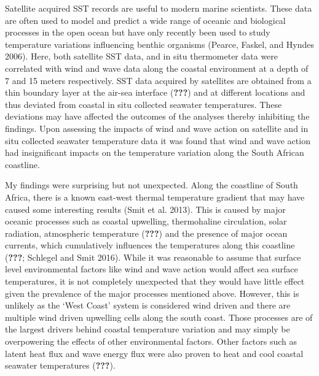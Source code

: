 \documentclass[12pt,a4paper,]{article}
\begin{document}
Satellite acquired SST records are useful to modern marine scientists.
These data are often used to model and predict a wide range of oceanic
and biological processes in the open ocean but have only recently been
used to study temperature variations influencing benthic organisms
(Pearce, Faskel, and Hyndes 2006). Here, both satellite SST data, and in
situ thermometer data were correlated with wind and wave data along the
coastal environment at a depth of 7 and 15 meters respectively. SST data
acquired by satellites are obtained from a thin boundary layer at the
air-sea interface ({\textbf{???}}) and at different locations and thus
deviated from coastal in situ collected seawater temperatures. These
deviations may have affected the outcomes of the analyses thereby
inhibiting the findings. Upon assessing the impacts of wind and wave
action on satellite and in situ collected seawater temperature data it
was found that wind and wave action had insignificant impacts on the
temperature variation along the South African coastline.

My findings were surprising but not unexpected. Along the coastline of
South Africa, there is a known east-west thermal temperature gradient
that may have caused some interesting results (Smit et al. 2013). This
is caused by major oceanic processes such as coastal upwelling,
thermohaline circulation, solar radiation, atmospheric temperature
({\textbf{???}}) and the presence of major ocean currents, which
cumulatively influences the temperatures along this coastline
({\textbf{???}}; Schlegel and Smit 2016). While it was reasonable to
assume that surface level environmental factors like wind and wave
action would affect sea surface temperatures, it is not completely
unexpected that they would have little effect given the prevalence of
the major processes mentioned above. However, this is unlikely as the
`West Coast' system is considered wind driven and there are multiple
wind driven upwelling cells along the south coast. Those processes are
of the largest drivers behind coastal temperature variation and may
simply be overpowering the effects of other environmental factors. Other
factors such as latent heat flux and wave energy flux were also proven
to heat and cool coastal seawater temperatures ({\textbf{???}}).
\end{document}

